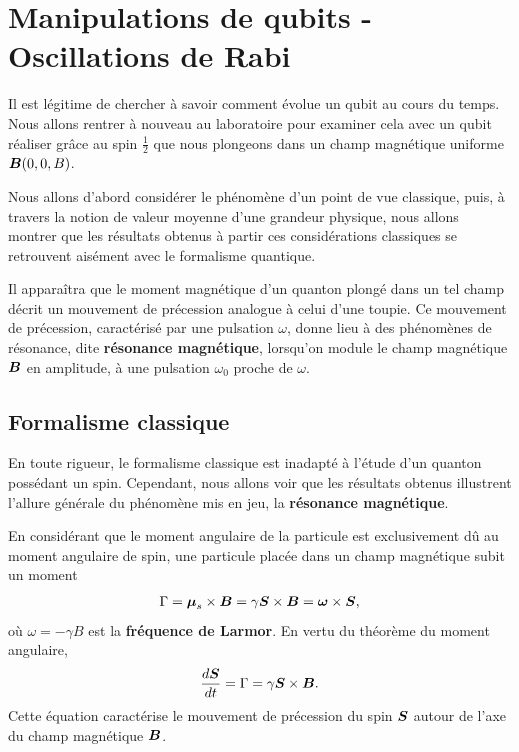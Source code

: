 \section{Manipulations de qubits - Oscillations de Rabi}
\label{sec:ESpin12}


Il est légitime de chercher à savoir comment évolue un qubit au cours du temps.
Nous allons rentrer à nouveau au laboratoire pour examiner cela avec un qubit
réaliser grâce au spin $\frac{1}{2}$ que nous plongeons dans un champ magnétique
uniforme $\boldsymbol{B}(0,0,B)$.

Nous allons d'abord considérer le phénomène d'un point de vue classique, puis,
à travers la notion de valeur moyenne d'une grandeur physique, nous allons
montrer que les résultats obtenus à partir ces considérations classiques se
retrouvent aisément avec le formalisme quantique.

Il apparaîtra que le moment magnétique d'un quanton plongé dans un tel champ
décrit un mouvement de précession analogue à celui d'une toupie. Ce mouvement de
précession, caractérisé par une pulsation $\omega$, donne lieu à des phénomènes
de résonance, dite \textbf{résonance magnétique}, lorsqu'on module le champ
magnétique $\boldsymbol{B}$ en amplitude, à une pulsation $\omega_0$ proche de
$\omega$.

\subsection{Formalisme classique}

En toute rigueur, le formalisme classique est inadapté à l'étude d'un quanton
possédant un spin. Cependant, nous allons voir que les résultats obtenus
illustrent l'allure générale du phénomène mis en jeu, la \textbf{résonance
magnétique}.

En considérant que le moment angulaire de la particule est exclusivement dû au
moment angulaire de spin, une particule placée dans un champ magnétique subit un
moment
\begin{equation}
 \Gamma=\boldsymbol{\mu}_{s}\times\boldsymbol{B}=\gamma\boldsymbol{S}\times\boldsymbol{B}=\boldsymbol{\omega}
\times\boldsymbol{S},
\end{equation}
où $\omega=-\gamma B$  est la \textbf{fréquence de Larmor}. En vertu du théorème
du moment angulaire,
\begin{equation}
	\frac{d\boldsymbol{S}}{dt}=\Gamma=\gamma\boldsymbol{S}\times\boldsymbol{B}.
\end{equation}
Cette équation caractérise le mouvement de précession du spin $\boldsymbol{S}$ autour
de l'axe du champ magnétique $\boldsymbol{B}$.

